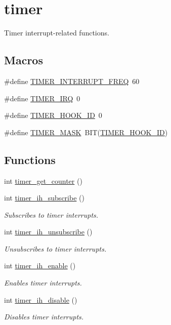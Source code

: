 \hypertarget{group__timer}{}\section{timer}
\label{group__timer}


Timer interrupt-\/related functions.  


\subsection*{Macros}
\begin{DoxyCompactItemize}
\item 
\#define \hyperlink{group__timer_ga6afdd2bea8e7518daaa2641def6638a5}{T\+I\+M\+E\+R\+\_\+\+I\+N\+T\+E\+R\+R\+U\+P\+T\+\_\+\+F\+R\+EQ}~60
\item 
\#define \hyperlink{group__timer_ga7095fb363d08f6646611f9a47806647b}{T\+I\+M\+E\+R\+\_\+\+I\+RQ}~0
\item 
\#define \hyperlink{group__timer_gacaa139b4a451d80a4cb00da3451edd5b}{T\+I\+M\+E\+R\+\_\+\+H\+O\+O\+K\+\_\+\+ID}~0
\item 
\#define \hyperlink{group__timer_gae41604e470c014060c92349437078e03}{T\+I\+M\+E\+R\+\_\+\+M\+A\+SK}~B\+IT(\hyperlink{group__timer_gacaa139b4a451d80a4cb00da3451edd5b}{T\+I\+M\+E\+R\+\_\+\+H\+O\+O\+K\+\_\+\+ID})
\end{DoxyCompactItemize}
\subsection*{Functions}
\begin{DoxyCompactItemize}
\item 
int \hyperlink{group__timer_gacbda5965336eef31790e7a8b983332ff}{timer\+\_\+get\+\_\+counter} ()
\item 
int \hyperlink{group__timer_gae44be0cfa0b6e717152afc708577cf5d}{timer\+\_\+ih\+\_\+subscribe} ()
\begin{DoxyCompactList}\small\item\em Subscribes to timer interrupts. \end{DoxyCompactList}\item 
int \hyperlink{group__timer_ga5e9cfb5b4e41a1e647e0ee7d0ed6709a}{timer\+\_\+ih\+\_\+unsubscribe} ()
\begin{DoxyCompactList}\small\item\em Unsubscribes to timer interrupts. \end{DoxyCompactList}\item 
int \hyperlink{group__timer_ga4baf1b5c30d394576f8044178524e2c4}{timer\+\_\+ih\+\_\+enable} ()
\begin{DoxyCompactList}\small\item\em Enables timer interrupts. \end{DoxyCompactList}\item 
int \hyperlink{group__timer_ga4a90bd229401205fbf0222cc3228c22c}{timer\+\_\+ih\+\_\+disable} ()
\begin{DoxyCompactList}\small\item\em Disables timer interrupts. \end{DoxyCompactList}\end{DoxyCompactItemize}


